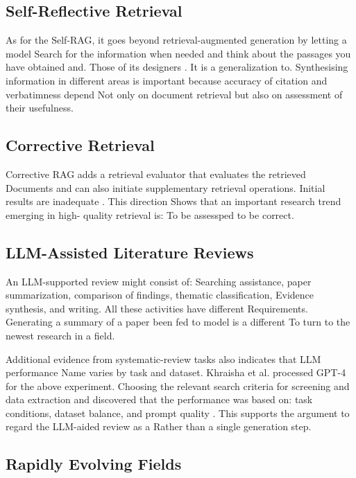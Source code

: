 \documentclass[acmsmall,screen]{acmart}
\begin{document}
\subsection{Self-Reflective Retrieval}

As for the Self-RAG, it goes beyond retrieval-augmented generation by letting a model
Search for the information when needed and think about the passages you have obtained and.
Those of its designers \cite{asai2024selfrag}. It is a generalization to.
Synthesising information in different areas is important because accuracy of citation and verbatimness depend
Not only on document retrieval but also on assessment of their
usefulness.

\subsection{Corrective Retrieval}

Corrective RAG adds a retrieval evaluator that evaluates the retrieved
Documents and can also initiate supplementary retrieval operations.
Initial results are inadequate \cite{yan2024crag}. This direction
Shows that an important research trend emerging in high- quality retrieval is:
To be assessped to be correct.

\subsection{LLM-Assisted Literature Reviews}

An LLM-supported review might consist of: Searching assistance,
paper summarization, comparison of findings, thematic classification,
Evidence synthesis, and writing. All these activities have different
Requirements. Generating a summary of a paper been fed to model is a different
To turn to the newest research in a field.

Additional evidence from systematic-review tasks also indicates that LLM performance
Name varies by task and dataset. Khraisha et al. processed GPT-4 for the above experiment.
Choosing the relevant search criteria for screening and data extraction and discovered that the performance was based on:
task conditions, dataset balance, and prompt quality
\cite{khraisha2024}. This supports the argument to regard the LLM-aided review as a
Rather than a single generation step.

\subsection{Rapidly Evolving Fields}
\end{document}
